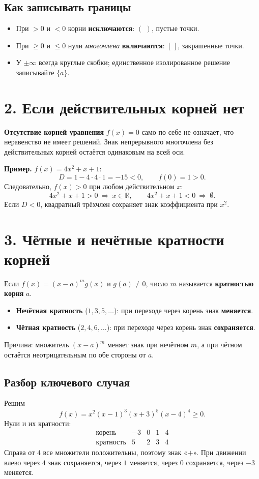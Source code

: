 \documentclass[a4paper,12pt]{article}
\newcommand{\key}[1]{{\color{darkaccent}\textbf{#1}}}
\newcommand{\note}[1]{{\small\color{quiet}#1}}
\newcommand{\headsec}[1]{\section*{\color{darkaccent}#1}\vspace{-6pt}{\color{hair}\rule{\linewidth}{0.55pt}}\par\vspace{2pt}}
\newcommand{\headsub}[1]{\subsection*{\color{accent}#1}\vspace{-4pt}}
\newcommand{\R}{\mathbb{R}}
\begin{document}
\headsub{Как записывать границы}
\begin{itemize}
\item При \(>0\) и \(<0\) корни \key{исключаются}: \((\,\,)\), пустые точки.
\item При \(\ge0\) и \(\le0\) нули \emph{многочлена} \key{включаются}: \([\,]\), закрашенные точки.
\item У \(\pm\infty\) всегда круглые скобки; единственное изолированное решение записывайте \(\{a\}\).
\end{itemize}

\headsec{2. Если действительных корней нет}
\key{Отсутствие корней уравнения} \(f(x)=0\) само по себе не означает,
что неравенство не имеет решений. Знак непрерывного многочлена без
действительных корней остаётся одинаковым на всей оси.

\key{Пример.} \(f(x)=4x^2+x+1\):
\[
D=1-4\cdot4\cdot1=-15<0,\qquad f(0)=1>0.
\]
Следовательно, \(f(x)>0\) при любом действительном \(x\):
\[
4x^2+x+1>0\ \Longrightarrow\ x\in\R,\qquad
4x^2+x+1<0\ \Longrightarrow\ \emptyset.
\]
\note{Если \(D<0\), квадратный трёхчлен сохраняет знак коэффициента при \(x^2\).}

\clearpage
\headsec{3. Чётные и нечётные кратности корней}
Если \(f(x)=(x-a)^m g(x)\) и \(g(a)\ne0\), число \(m\) называется
\key{кратностью корня} \(a\).
\begin{itemize}
\item \key{Нечётная кратность} (\(1,3,5,\ldots\)): при переходе через корень знак \key{меняется}.
\item \key{Чётная кратность} (\(2,4,6,\ldots\)): при переходе через корень знак \key{сохраняется}.
\end{itemize}
\note{Причина: множитель \((x-a)^m\) меняет знак при нечётном \(m\), а при чётном остаётся неотрицательным по обе стороны от \(a\).}

\headsub{Разбор ключевого случая}
Решим
\[
f(x)=x^2(x-1)^3(x+3)^5(x-4)^4\ge0.
\]
Нули и их кратности:
\[
\begin{array}{c|cccc}
\text{корень}&-3&0&1&4\\ \hline
\text{кратность}&5&2&3&4
\end{array}
\]
Справа от \(4\) все множители положительны, поэтому знак «\(+\)».
При движении влево через \(4\) знак сохраняется, через \(1\) меняется,
через \(0\) сохраняется, через \(-3\) меняется.
\end{document}
